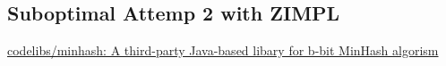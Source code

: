 \documentclass{article}
\begin{document}
\subsection{Suboptimal Attemp 2 with ZIMPL}












\begin{thebibliography}{9}
      \href{https://github.com/codelibs/minhash}{codelibs/minhash: A third-party Java-based libary  for b-bit MinHash algorism}


\end{thebibliography} %
\end{document}

